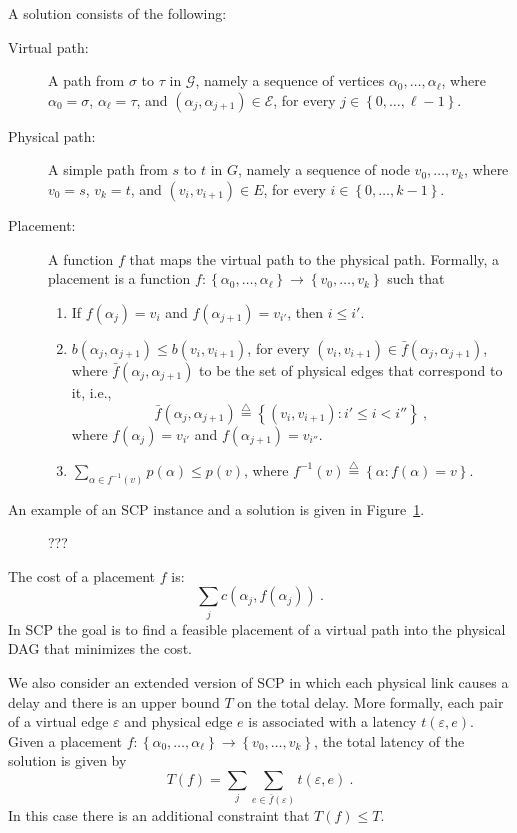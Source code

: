 \documentclass[runningheads]{llncs}
\newcommand{\eqdf}{\stackrel{\scriptscriptstyle \triangle}{=}}
\newcommand{\set}[1]{\left\{ #1 \right\}}
\newcommand{\eps}{\varepsilon}
\newcommand{\scp}{\textsc{SCP}\xspace}
\newcommand{\calE}{\mathcal{E}}
\newcommand{\calG}{\mathcal{G}}
\begin{document}
A solution consists of the following:
\begin{description}
\item[Virtual path:] A path from $\sigma$ to $\tau$ in $\calG$, namely
  a sequence of vertices $\alpha_0,\ldots,\alpha_\ell$, where
  $\alpha_0 = \sigma$, $\alpha_\ell = \tau$, and
  $(\alpha_j,\alpha_{j+1}) \in \calE$, for every $j \in
  \set{0,\ldots,\ell-1}$.

\item[Physical path:] A simple path from $s$ to $t$ in $G$, namely a
  sequence of node $v_0,\ldots,v_k$, where $v_0 = s$, $v_k = t$, and
  $(v_i,v_{i+1}) \in E$, for every $i \in \set{0,\ldots,k-1}$.
  
\item[Placement:] A function $f$ that maps the virtual path to the
  physical path.  Formally, a placement is a function $f:
  \set{\alpha_0,\ldots,\alpha_\ell} \to \set{v_0,\ldots,v_k}$
  such that
\begin{enumerate}
\item If $f(\alpha_j) = v_i$ and $f(\alpha_{j+1}) = v_{i'}$, then $i
  \leq i'$.
\item $b(\alpha_j,\alpha_{j+1}) \leq b(v_i,v_{i+1})$, for every
  $(v_i,v_{i+1}) \in \bar{f}(\alpha_j,\alpha_{j+1})$, where
  $\bar{f}(\alpha_j,\alpha_{j+1})$ to be the set of physical edges
  that correspond to it, i.e.,
\[
\bar{f}(\alpha_j,\alpha_{j+1}) \eqdf \set{(v_i,v_{i+1}) : i' \leq i < i''}
~,
\]
  where $f(\alpha_j) = v_{i'}$ and $f(\alpha_{j+1}) = v_{i''}$.

\item $\sum_{\alpha \in f^{-1}(v)} p(\alpha) \leq p(v)$, where
  $f^{-1}(v) \eqdf \set{\alpha : f(\alpha) = v}$.
 
\end{enumerate}
\end{description}

An example of an \scp instance and a solution is given in
Figure~\ref{fig:solution}.

\begin{figure}
\centering
\scalebox{1}{

}
\caption{???}
\label{fig:solution}
\end{figure}

The cost of a placement $f$ is:
\[
\sum_j c(\alpha_j,f(\alpha_j))
~.
\]
In \scp the goal is to find a feasible placement of a virtual path
into the physical DAG that minimizes the cost.


We also consider an extended version of \scp in which each physical
link causes a delay and there is an upper bound $T$ on the total
delay.  More formally, each pair of a virtual edge $\eps$ and physical
edge $e$ is associated with a latency $t(\eps,e)$.
%
Given a placement $f: \set{\alpha_0,\ldots,\alpha_\ell} \to
\set{v_0,\ldots,v_k}$, the total latency of the solution is given by
\[
T(f) = \sum_j \sum_{e \in \bar{f}(\eps)} t(\eps,e)
~.
\]
In this case there is an additional constraint that $T(f) \leq T$.
\end{document}
